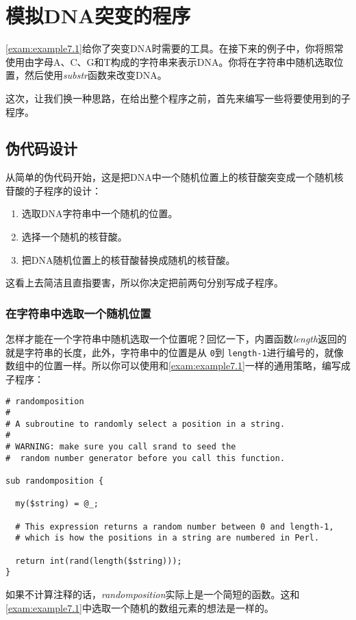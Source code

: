 \section{模拟DNA突变的程序}
\autoref{exam:example7.1}给你了突变DNA时需要的工具。在接下来的例子中，你将照常使用由字母A、C、G和T构成的字符串来表示DNA。你将在字符串中随机选取位置，然后使用\textit{substr}函数来改变DNA。

这次，让我们换一种思路，在给出整个程序之前，首先来编写一些将要使用到的子程序。

\subsection{伪代码设计}
从简单的伪代码开始，这是把DNA中一个随机位置上的核苷酸突变成一个随机核苷酸的子程序的设计：

\begin{enumerate}
  \item 选取DNA字符串中一个随机的位置。
  \item 选择一个随机的核苷酸。
  \item 把DNA随机位置上的核苷酸替换成随机的核苷酸。
\end{enumerate}

这看上去简洁且直指要害，所以你决定把前两句分别写成子程序。
\subsubsection{在字符串中选取一个随机位置}
怎样才能在一个字符串中随机选取一个位置呢？回忆一下，内置函数\textit{length}返回的就是字符串的长度，此外，字符串中的位置是从 \verb|0|到 \verb|length-1|进行编号的，就像数组中的位置一样。所以你可以使用和\autoref{exam:example7.1}一样的通用策略，编写成子程序：

\begin{lstlisting}
# randomposition
#
# A subroutine to randomly select a position in a string.
#
# WARNING: make sure you call srand to seed the
#  random number generator before you call this function.

sub randomposition {

  my($string) = @_;

  # This expression returns a random number between 0 and length-1,
  # which is how the positions in a string are numbered in Perl.

  return int(rand(length($string)));
}
\end{lstlisting}

如果不计算注释的话，\textit{randomposition}实际上是一个简短的函数。这和\autoref{exam:example7.1}中选取一个随机的数组元素的想法是一样的。

